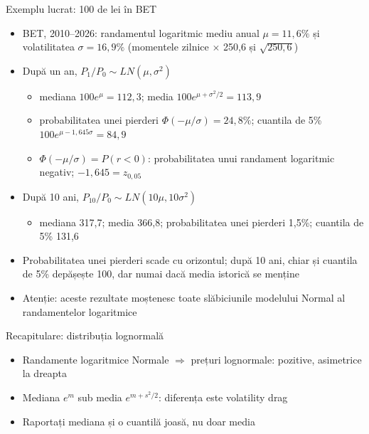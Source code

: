 \begin{frame}{Exemplu lucrat: 100 de lei în BET}
\itemsize{\footnotesize}
\begin{itemize}
    \item BET, 2010--2026: randamentul logaritmic mediu anual $\mu = 11{,}6\%$ și volatilitatea $\sigma = 16{,}9\%$ (momentele zilnice $\times$ 250{,}6 și $\sqrt{250{,}6}$)
    \item După un an, $P_1/P_0 \sim LN(\mu, \sigma^2)$
    \begin{itemize}
        \item mediana $100e^{\mu} = 112{,}3$; media $100e^{\mu + \sigma^2/2} = 113{,}9$
        \item probabilitatea unei pierderi $\Phi(-\mu/\sigma) = 24{,}8\%$; cuantila de 5\% $100e^{\mu - 1{,}645\sigma} = 84{,}9$
        \item $\Phi(-\mu/\sigma) = P(r < 0)$: probabilitatea unui randament logaritmic negativ; $-1{,}645 = z_{0{,}05}$
    \end{itemize}
    \item După 10 ani, $P_{10}/P_0 \sim LN(10\mu, 10\sigma^2)$
    \begin{itemize}
        \item mediana 317{,}7; media 366{,}8; probabilitatea unei pierderi 1{,}5\%; cuantila de 5\% 131{,}6
    \end{itemize}
    \item Probabilitatea unei pierderi scade cu orizontul; după 10 ani, chiar și cuantila de 5\% depășește 100, dar numai dacă media istorică se menține
    \item Atenție: aceste rezultate moștenesc toate slăbiciunile modelului Normal al randamentelor logaritmice
\end{itemize}
\end{frame}

\begin{frame}{Recapitulare: distribuția lognormală}
\itemsize{\small}
\begin{itemize}
    \item Randamente logaritmice Normale $\Rightarrow$ prețuri lognormale: pozitive, asimetrice la dreapta
    \item Mediana $e^m$ sub media $e^{m + s^2/2}$: diferența este volatility drag
    \item Raportați mediana și o cuantilă joasă, nu doar media
\end{itemize}
\end{frame}


